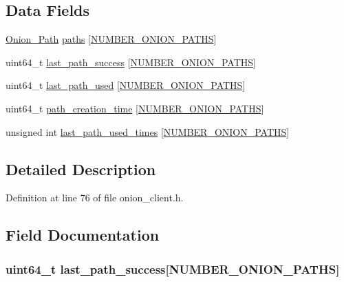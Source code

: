 \subsection*{Data Fields}
\begin{DoxyCompactItemize}
\item 
\hyperlink{struct_onion___path}{Onion\+\_\+\+Path} \hyperlink{struct_onion___client___paths_afaa8c1f23d89bd5acee1f956e8872061}{paths} \mbox{[}\hyperlink{onion__client_8h_a69d73a99a8788ce76768d6cd589da123}{N\+U\+M\+B\+E\+R\+\_\+\+O\+N\+I\+O\+N\+\_\+\+P\+A\+T\+H\+S}\mbox{]}
\item 
uint64\+\_\+t \hyperlink{struct_onion___client___paths_afbee813e09086f6993c94cdaafe2ae36}{last\+\_\+path\+\_\+success} \mbox{[}\hyperlink{onion__client_8h_a69d73a99a8788ce76768d6cd589da123}{N\+U\+M\+B\+E\+R\+\_\+\+O\+N\+I\+O\+N\+\_\+\+P\+A\+T\+H\+S}\mbox{]}
\item 
uint64\+\_\+t \hyperlink{struct_onion___client___paths_a3e3d1429ce10f2adad7b1c02df8f5417}{last\+\_\+path\+\_\+used} \mbox{[}\hyperlink{onion__client_8h_a69d73a99a8788ce76768d6cd589da123}{N\+U\+M\+B\+E\+R\+\_\+\+O\+N\+I\+O\+N\+\_\+\+P\+A\+T\+H\+S}\mbox{]}
\item 
uint64\+\_\+t \hyperlink{struct_onion___client___paths_abc272861ece76f9d9bac356f7297ce3e}{path\+\_\+creation\+\_\+time} \mbox{[}\hyperlink{onion__client_8h_a69d73a99a8788ce76768d6cd589da123}{N\+U\+M\+B\+E\+R\+\_\+\+O\+N\+I\+O\+N\+\_\+\+P\+A\+T\+H\+S}\mbox{]}
\item 
unsigned int \hyperlink{struct_onion___client___paths_a3a947792d864563f1c4d6984cc9c638a}{last\+\_\+path\+\_\+used\+\_\+times} \mbox{[}\hyperlink{onion__client_8h_a69d73a99a8788ce76768d6cd589da123}{N\+U\+M\+B\+E\+R\+\_\+\+O\+N\+I\+O\+N\+\_\+\+P\+A\+T\+H\+S}\mbox{]}
\end{DoxyCompactItemize}


\subsection{Detailed Description}


Definition at line 76 of file onion\+\_\+client.\+h.



\subsection{Field Documentation}
\hypertarget{struct_onion___client___paths_afbee813e09086f6993c94cdaafe2ae36}{
\subsubsection[{last\+\_\+path\+\_\+success}]{\setlength{\rightskip}{0pt plus 5cm}uint64\+\_\+t last\+\_\+path\+\_\+success\mbox{[}{\bf N\+U\+M\+B\+E\+R\+\_\+\+O\+N\+I\+O\+N\+\_\+\+P\+A\+T\+H\+S}\mbox{]}}}\label{struct_onion___client___paths_afbee813e09086f6993c94cdaafe2ae36}


